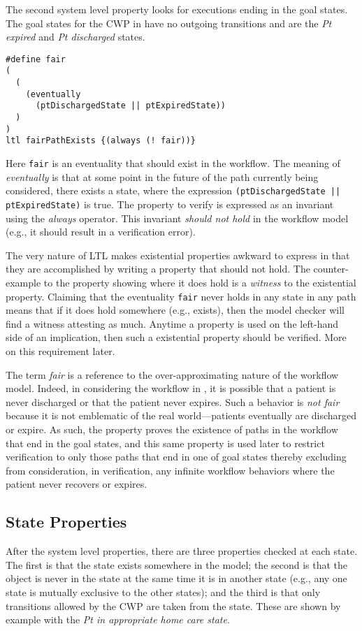 The second system level property looks for executions ending in the goal states. The goal states for the CWP in  have no outgoing transitions and are the \emph{Pt expired} and \emph{Pt discharged} states.
%
{\small
\begin{lstlisting}[style=myPromela]
#define fair
(
  (
    (eventually 
      (ptDischargedState || ptExpiredState))
  )
)
ltl fairPathExists {(always (! fair))}
\end{lstlisting}
}
%
\noindent Here \texttt{fair} is an eventuality that should exist in the workflow. The meaning of \emph{eventually} is that at some point in the future of the path currently being considered, there exists a state, where the expression \texttt{(ptDischargedState || ptExpiredState)} is true. The property to verify is expressed as an invariant using the \emph{always} operator. This invariant \emph{should not hold} in the workflow model (e.g., it should result in a verification error). 

The very nature of LTL makes existential properties awkward to express in that they are accomplished by writing a property that should not hold. The counter-example to the property showing where it does hold is a \emph{witness} to the existential property. Claiming that the eventuality \texttt{fair} never holds in any state in any path means that if it does hold somewhere (e.g., exists), then the model checker will find a witness attesting as much. Anytime a property is used on the left-hand side of an implication, then such a existential property should be verified. More on this requirement later.

The term \emph{fair} is a reference to the over-approximating nature of the workflow model. Indeed, in considering the workflow in , it is possible that a patient is never discharged or that the patient never expires. Such a behavior is \emph{not fair} because it is not emblematic of the real world---patients eventually are discharged or expire. As such, the property proves the existence of paths in the workflow that end in the goal states, and this same property is used later to restrict verification to only those paths that end in one of goal states thereby excluding from consideration, in verification, any infinite workflow behaviors where the patient never recovers or expires.

\subsection{State Properties}
After the system level properties, there are three properties checked at each state. The first is that the state exists somewhere in the model; the second is that the object is never in the state at the same time it is in another state (e.g., any one state is mutually exclusive to the other states); and the third is that only transitions allowed by the CWP are taken from the state. These are shown by example with the \emph{Pt in appropriate home care state}.

